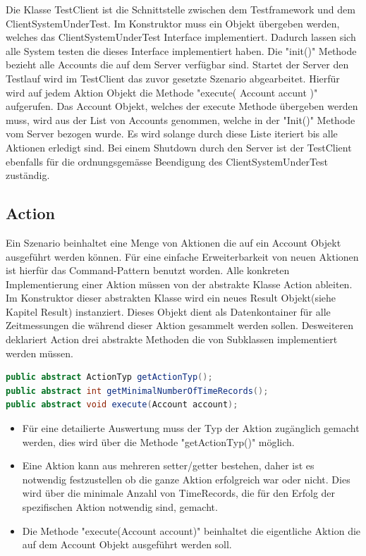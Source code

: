 Die Klasse TestClient ist die Schnittstelle zwischen dem Testframework und dem ClientSystemUnderTest. Im Konstruktor muss ein Objekt übergeben werden, welches das ClientSystemUnderTest Interface implementiert. Dadurch lassen sich alle System testen die dieses Interface implementiert haben. Die "init()" Methode bezieht alle Accounts die auf dem Server verfügbar sind. Startet der Server den Testlauf wird im TestClient das zuvor gesetzte Szenario abgearbeitet. Hierfür wird auf jedem Aktion Objekt die Methode "execute( Account accunt )" aufgerufen. Das Account Objekt, welches der execute Methode übergeben werden muss, wird aus der List von Accounts genommen, welche in der "Init()" Methode vom Server bezogen wurde. Es wird solange durch diese Liste iteriert bis alle Aktionen erledigt sind. Bei einem Shutdown durch den Server ist der TestClient ebenfalls für die ordnungsgemässe Beendigung des ClientSystemUnderTest zuständig.

\subsection{Action}
\label{sec:action}
Ein Szenario beinhaltet eine Menge von Aktionen die auf ein Account Objekt ausgeführt werden können. Für eine einfache Erweiterbarkeit von neuen Aktionen ist hierfür das Command-Pattern benutzt worden. Alle konkreten Implementierung einer Aktion müssen von der abstrakte Klasse Action ableiten. Im Konstruktor  dieser abstrakten Klasse wird ein neues Result Objekt(siehe Kapitel Result) instanziert. Dieses Objekt dient als Datenkontainer für alle Zeitmessungen die während dieser Aktion gesammelt werden sollen. Desweiteren deklariert Action drei abstrakte Methoden die von Subklassen implementiert werden müssen.
\begin{lstlisting}[language=java, breaklines=true] 	
public abstract ActionTyp getActionTyp();
public abstract int getMinimalNumberOfTimeRecords();
public abstract void execute(Account account);	
\end{lstlisting}

\begin{itemize}
\item Für eine detailierte Auswertung muss der Typ der Aktion zugänglich gemacht werden, dies wird über die Methode "getActionTyp()" möglich.
\item Eine Aktion kann aus mehreren setter/getter bestehen, daher ist es notwendig festzustellen ob die ganze Aktion erfolgreich war oder nicht. Dies wird über die minimale Anzahl von TimeRecords, die für den Erfolg der spezifischen Aktion notwendig sind, gemacht. 
\item Die Methode "execute(Account account)" beinhaltet die eigentliche Aktion die auf dem Account Objekt ausgeführt werden soll.
\end{itemize} 

